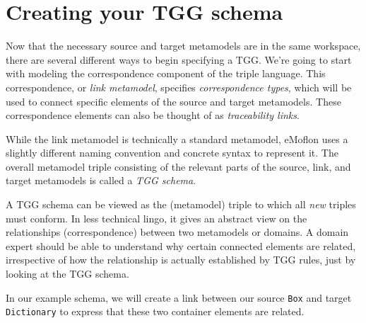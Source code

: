 \newpage
\hypertarget{TGGSchema}{}
\section{Creating your TGG schema}
\genHeader

Now that the necessary source and target metamodels are in the same workspace, there are several different ways to begin specifying a TGG. We're going to start
with modeling the correspondence component of the triple language. This correspondence, or \emph{link metamodel}, specifies
\emph{correspondence types}, which will be used to connect specific elements of the source and target metamodels. These
correspondence elements can also be thought of as \emph{traceability links}.

While the link metamodel is technically a standard metamodel, eMoflon uses a slightly different naming convention and concrete syntax to represent it. The
overall metamodel triple consisting of the relevant parts of the source, link, and target metamodels is called a \emph{TGG schema}.

A TGG schema can be viewed as the (metamodel) triple to which all \emph{new} triples must conform. In less technical lingo, it gives an abstract view on the
relationships (correspondence) between two metamodels or domains. A domain expert should be able to understand why certain connected elements are related,
irrespective of how the relationship is actually established by TGG rules, just by looking at the TGG schema. 

In our example schema, we will create a link between our source \texttt{Box} and target \texttt{Dictionary} to express that these two container elements are
related.





